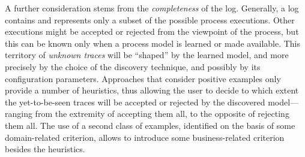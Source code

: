 A further consideration stems from the \emph{completeness} of the log. Generally, a log contains and represents only a subset of the possible process executions. Other executions might be accepted or rejected from the viewpoint of the process, but this can be known only when a process model is learned or made available. This territory of \emph{unknown traces} will be ``shaped'' by the learned model, and more precisely by the choice of the discovery technique, and possibly by its configuration parameters. Approaches that consider positive examples only provide a number of heuristics, thus allowing the user to decide to which extent the yet-to-be-seen traces will be accepted or rejected by the discovered model---ranging from the extremity of accepting them all, to the opposite of rejecting them all.
The use of a second class of examples, identified on the basis of some domain-related criterion, allows to introduce some business-related criterion besides the heuristics.


%


